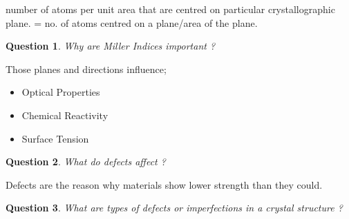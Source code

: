 \documentclass[13]{article}
\newtheorem{exer}{Question}
\begin{document}
number of atoms per unit area that are centred on particular crystallographic plane. = no. of atoms centred on a plane/area of the plane.
\begin{exer}
Why are Miller Indices important ?
\end{exer}
Those planes and directions influence;
\begin{itemize}

\item Optical Properties
\item Chemical Reactivity 
\item Surface Tension 
\end{itemize}
\begin{exer}
What do defects affect ?
\end{exer}
Defects are the reason why materials show lower strength than they could.
\begin{exer}
What are types of defects or imperfections in a crystal structure ?
\end{exer}
\end{document}

